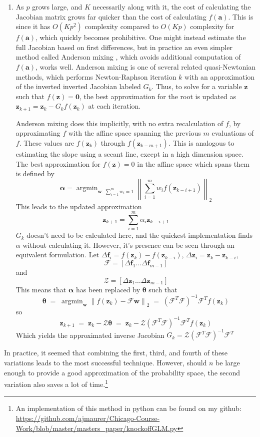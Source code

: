 \documentclass[11pt]{article}
\theoremstyle{definition}
\DeclareMathOperator*{\argmin}{arg\min}
\begin{document}
\begin{enumerate}
            \item As $p$ grows large, and $K$ necessarily along with it, the cost of calculating the Jacobian matrix grows far quicker than the cost of calculating $f(\mathbf a)$. This is since it has $O(Kp^2)$ complexity compared to $O(Kp)$ complexity for $f(\mathbf a)$, which quickly becomes prohibitive. One might instead estimate the full Jacobian based on first differences, but in practice an even simpler method called Anderson mixing \cite{Fang07twoclasses}, which avoids additional computation of $f(\mathbf a)$, works well. Anderson mixing is one of several related quasi-Newtonian methods, which performs Newton-Raphson iteration $k$ with an approximation of the inverted inverted Jacobian labeled $G_k$. Thus, to solve for a variable $\mathbf z$ such that $f(\mathbf z)=\mathbf 0$, the best approximation for the root is updated as $\mathbf{z}_{k+1}=\mathbf{z}_k - G_k f(\mathbf{z}_k)$ at each iteration. \par
    Anderson mixing does this implicitly, with no extra recalculation of $f$, by approximating $f$ with the affine space spanning the previous $m$ evaluations of $f$. These values are $f(\mathbf z_{k})$ through $f(\mathbf z_{k-m+1})$. This is analogous to estimating the slope using a secant line, except in a high dimension space. The best approximation for $f(\mathbf z)=0$ in the affine space which spans them is defined by
    \[ \mathbf \alpha = \argmin_{\mathbf w:\, \sum_{i=1}^m w_i=1} \left\|\sum_{i=1}^m  w_i f(\mathbf z_{k-i+1}) \right\|_2 \]
    This leads to the updated approximation
    \[ \mathbf z_{k+1} = \sum_{i=1}^{m} \alpha_{i} \mathbf z_{k-i+1} \]
    $G_k$ doesn't need to be calculated here, and the quickest implementation finds $\alpha$ without calculating it. However, it's presence can be seen through an equivalent formulation. Let $\Delta \mathbf f_i = f(\mathbf z_k) - f(\mathbf z_{k-i})$, $\Delta \mathbf z_i = \mathbf z_k - \mathbf z_{k-i}$, 
    \[ \mathcal F = [\Delta \mathbf f_1 \ldots \Delta \mathbf f_{m-1}] \]
    and
    \[ \mathcal Z = [\Delta \mathbf z_1 \ldots \Delta \mathbf z_{m-1}] \]
    This means that $\mathbf\alpha$ has been replaced by $\mathbf\theta$ such that
    \[ \mathbf \theta \; = \;\argmin_{\mathbf w} \left\|f(\mathbf z_{k}) - \mathcal  F \mathbf w\right\|_2\; = \;(\mathcal F^T \mathcal F)^{-1}\mathcal F^Tf(\mathbf z_k) \]
    so 
    \[ \mathbf z_{k+1} \;= \;\mathbf z_{k} - \mathcal Z \mathbf \theta\; = \; \mathbf z_{k} - \mathcal Z(\mathcal F^T \mathcal F)^{-1}\mathcal F^T f(\mathbf z_k) \]
    Which yields the approximated inverse Jacobian $G_k= \mathcal Z(\mathcal F^T \mathcal F)^{-1}\mathcal F^T$
        \end{enumerate}
        In practice, it seemed that combining the first, third, and fourth of these variations leads to the most successful technique. However, should $n$ be large enough to provide a good approximation of the probability space, the second variation also saves a lot of time.\footnote{An implementation of this method in python can be found on my github: \url{https://github.com/ajmaurer/Chicago-Course-Work/blob/master/masters_paper/knockoffGLM.py}}
\end{document}
